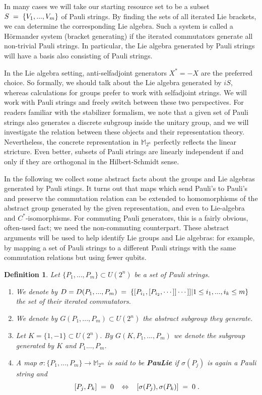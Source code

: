 \documentclass[12pt, a4-paper]{amsart}
\numberwithin{equation}{section}
\newcommand{\lel}{\pl = \pl}
\newcommand{\pl}{\hspace{.1cm}}
\newcommand{\pll}{\hspace{.3cm}}
\newcommand{\mz}{{\mathbb M}}
\newcommand{\si}{\sigma}
\newtheorem{defi}[lemma]{Definition}
\begin{document}
 In many cases we will take our starting resource set to be a subset $S\lel \{V_1,...,V_m\}$ of Pauli strings. By finding the sets of all iterated Lie brackets, we can determine the corresponding Lie algebra. Such a system is called a H\"ormander system \cite{10.1007/BF02392081} (bracket generating) if the iterated commutators generate all non-trivial Pauli strings. In particular, the Lie algebra generated by Pauli strings will have a basis also consisting of Pauli strings. 
 
 In the Lie algebra setting, anti-selfadjoint generators $X^{*}=-X$ are the preferred choice. So formally, we should talk about the Lie algebra generated by $iS$, whereas calculations for groups prefer to work with selfadjoint strings.  We will work with Pauli strings and freely switch between these two perspectives. For readers familiar with the stabilizer formalism, we note that a given set of Pauli strings also generates a discrete subgroup inside the unitary group, and we will investigate the relation between these objects and their representation theory. Nevertheless, the concrete representation in $\mz_{2^n}$ perfectly reflects the linear stricture. Even better, subsets of Pauli strings are linearly independent if and only if they are orthogonal in the Hilbert-Schmidt sense. 

In the following we collect some abstract facts about the groups and Lie algebras generated by Pauli stings. It turns out that maps which send Pauli's to Pauli's and preserve the commutation relation can be extended to homomorphisms of the abstract group generated by the given representation, and even to Lie-algebra and $C^*$-isomorphisms.  For commuting Pauli generators, this is a fairly obvious, often-used fact; we need the non-commuting counterpart. These abstract arguments will be used to help identify Lie groups and Lie algebras: for example, by mapping a set of Pauli strings to a different Pauli strings with the same commutation relations but using fewer qubits.

\begin{defi} \label{def:paulie} Let $\{P_1,...,P_m\}\subset U(2^n)$ be a set of Pauli strings. 
 \begin{enumerate}
 \item[i)] We denote by $ D=D(P_1,...,P_m) \lel \{[P_{i_1},[P_{i_2},\cdots ]]\cdots ]] | 1\le  i_1,...,i_k\le m \}$  
the set of their iterated commutators.  
\item[ii)] We denote by $G(P_1,...,P_m)\subset U(2^n)$ the abstract subgroup they generate. 
\item[iii)] Let $K=\{1,-1\}\subset U(2^n)$. By $G(K,P_1,...,P_m)$ we denote the subgroup generated by $K$ and $P_1...,P_m$. 
  \item[ii)] A map  $\si:\{P_1,...,P_m\}\to \mz_{2^m}$ is said to be \textbf{PauLie} if $\si(P_j)$ is again a Pauli string and
 \[ [P_j,P_k]\lel 0 \pll \Leftrightarrow \pll [\si(P_j),\si(P_k)] \lel 0 \pl .\]
 \end{enumerate}
 \end{defi}
\end{document}
